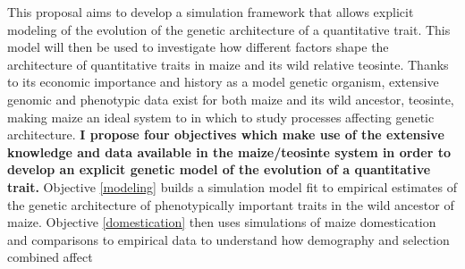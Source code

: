 This proposal aims to develop a simulation framework that allows explicit modeling of the evolution of the genetic architecture of a quantitative trait. This model will then be used to investigate how different factors shape the architecture of quantitative traits in maize and its wild relative teosinte. %
Thanks to its economic importance and history as a model genetic organism, extensive genomic \citep{Wright:2005,Hufford:2012dy} and phenotypic \citep{Wallace:2014,Weber:2009} data exist for both maize and its wild ancestor, teosinte, making maize an ideal system to in which to study processes affecting genetic architecture.  
\textbf{I propose four objectives which make use of the extensive knowledge and data available in the maize\//teosinte system in order to develop an explicit genetic model of the evolution of a quantitative trait.} %
Objective \ref{modeling} builds a simulation model fit to empirical estimates of the genetic architecture of phenotypically important traits in the wild ancestor of maize. Objective \ref{domestication} then uses simulations of maize domestication and comparisons to empirical data to understand how demography and selection combined affect %
